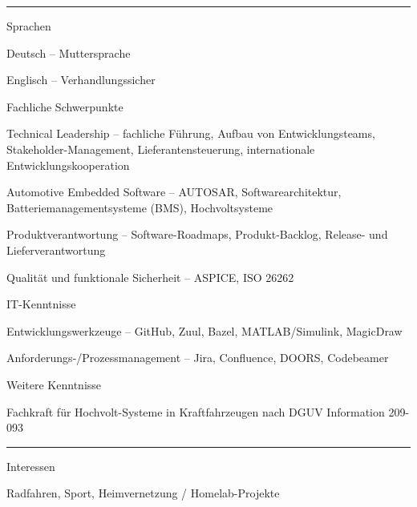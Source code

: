 \documentclass[a4paper,10pt]{article}
\newlength{\cvcolumngapwidth}
\newlength{\cvleftcolumnwidth}
\newlength{\cvrightcolumnwidth}
\newcommand{\cvsectionstyle}[1]{{\normalsize\cvsectionfont\textcolor{cvsectioncolor}{#1}}}
\newcommand{\cvheadingstyle}[1]{{\normalsize\cvheadingfont\textcolor{cvheadingcolor}{#1}}}
\newlength{\cvafteritemskipamount}
\newlength{\cvaftersectionskipamount}
\newlength{\cvbetweensectionandheadingextraskipamount}
\newlength{\cvparskip}
\newcommand{\cvsection}[1]{
    \begin{minipage}[t]{\cvleftcolumnwidth}
        \raggedleft\cvsectionstyle{#1}
    \end{minipage}%
    \hspace{\cvcolumngapwidth}%
    \begin{minipage}[t]{\cvrightcolumnwidth}
        \textcolor{cvrulecolor}{\rule{\cvrightcolumnwidth}{0.3mm}}
    \end{minipage}

    \vspace{\cvaftersectionskipamount}
}
\newcommand{\cvitem}[2]{
    \begin{minipage}[t]{\cvleftcolumnwidth}
        \raggedleft #1
    \end{minipage}%
    \hspace{\cvcolumngapwidth}%
    \begin{minipage}[t]{\cvrightcolumnwidth}
        \setlength{\parskip}{\cvparskip} #2
    \end{minipage}

    \vspace{\cvafteritemskipamount}
}
\begin{document}
\cvsection{KENNTNISSE}

\vspace{\cvbetweensectionandheadingextraskipamount}

\cvitem{
    \cvheadingstyle{Sprachen}
}{
    Deutsch -- Muttersprache

    Englisch -- Verhandlungssicher
}

\cvitem{
    \cvheadingstyle{Fachliche Schwerpunkte}
}{
    Technical Leadership – fachliche Führung, Aufbau von Entwicklungsteams, Stakeholder-Management, Lieferantensteuerung, internationale Entwicklungskooperation

    Automotive Embedded Software -- AUTOSAR, Softwarearchitektur, Batteriemanagementsysteme (BMS), Hochvoltsysteme

    Produktverantwortung -- Software-Roadmaps, Produkt-Backlog, Release- und Lieferverantwortung

    Qualität und funktionale Sicherheit -- ASPICE, ISO 26262
}

\cvitem{
    \cvheadingstyle{IT-Kenntnisse}
}{
    Entwicklungswerkzeuge -- GitHub, Zuul, Bazel, MATLAB/Simulink, MagicDraw

    Anforderungs-/Prozessmanagement -- Jira, Confluence, DOORS, Codebeamer
}

\cvitem{
    \cvheadingstyle{Weitere Kenntnisse}
}{
    Fachkraft für Hochvolt-Systeme in Kraftfahrzeugen nach DGUV Information 209-093

}



\cvsection{ZUSÄTZLICHE ANGABEN}

\vspace{\cvbetweensectionandheadingextraskipamount}

\cvitem{
    \cvheadingstyle{Interessen}
}{
    Radfahren, Sport, Heimvernetzung / Homelab-Projekte
}
\end{document}
